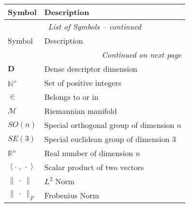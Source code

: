 \cleardoublepage
{}




\begin{longtable}{@{}l p{10cm}@{}}
    \toprule
    Symbol                              & Description                               \\
    \midrule
    \endfirsthead
    \multicolumn{2}{c}{\textit{List of Symbols -- continued}}                       \\
    \toprule
    Symbol                              & Description                               \\
    \midrule
    \endhead
    \bottomrule \multicolumn{2}{r}{\textit{Continued on next page}}                 \\
    \endfoot
    \bottomrule
    \endlastfoot

    \(\mathbf{D}\)                      & Dense descriptor dimension                \\
    \(\mathbb{N}^+\)                    & Set of positive integers                  \\
    \(\in\)                             & Belongs to or in                          \\
    \(\mathcal{M} \)                    & Riemannian manifold                       \\
    \(SO\left(n\right)\)                & Special orthogonal group of dimension $n$ \\
    \(SE\left(3\right)\)                & Special euclidean group of dimension 3    \\
    \(\mathbb{R}^n\)                    & Real number of dimension $n$              \\
    \(\left< \cdot \ ,\ \cdot \right>\) & Scalar product of two vectors             \\
    \(\| \ \cdot \ \|\)                 & $L^2$ Norm                                \\
    \(\| \ \cdot \ \|_F\)               & Frobenius Norm                            \\
\end{longtable}